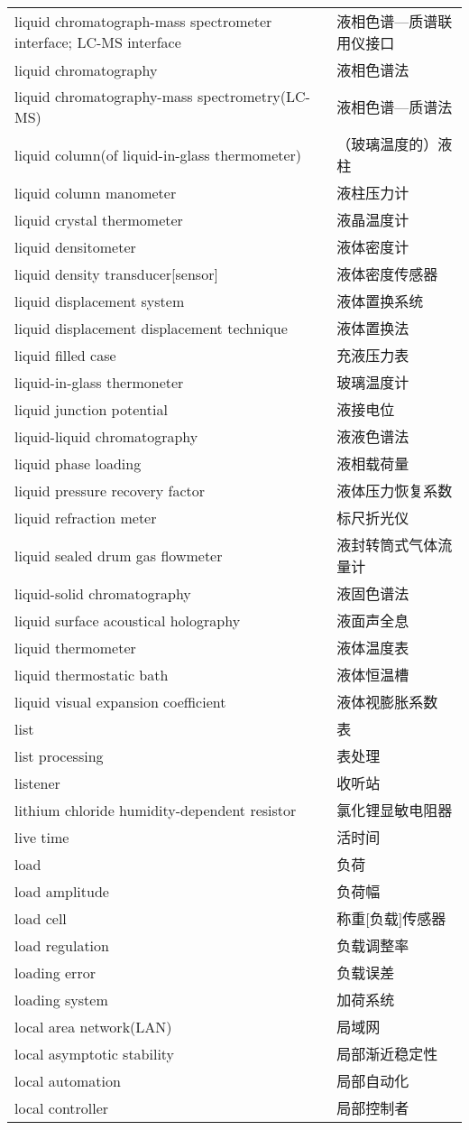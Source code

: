 \documentclass[
]{article}
\begin{document}
\begin{longtable}[]{@{}ll@{}}
liquid chromatograph-mass spectrometer interface; LC-MS interface &
液相色谱---质谱联用仪接口 \\
liquid chromatography & 液相色谱法 \\
liquid chromatography-mass spectrometry(LC-MS) & 液相色谱---质谱法 \\
liquid column(of liquid-in-glass thermometer) & （玻璃温度的）液柱 \\
liquid column manometer & 液柱压力计 \\
liquid crystal thermometer & 液晶温度计 \\
liquid densitometer & 液体密度计 \\
liquid density transducer{[}sensor{]} & 液体密度传感器 \\
liquid displacement system & 液体置换系统 \\
liquid displacement displacement technique & 液体置换法 \\
liquid filled case & 充液压力表 \\
liquid-in-glass thermoneter & 玻璃温度计 \\
liquid junction potential & 液接电位 \\
liquid-liquid chromatography & 液液色谱法 \\
liquid phase loading & 液相载荷量 \\
liquid pressure recovery factor & 液体压力恢复系数 \\
liquid refraction meter & 标尺折光仪 \\
liquid sealed drum gas flowmeter & 液封转筒式气体流量计 \\
liquid-solid chromatography & 液固色谱法 \\
liquid surface acoustical holography & 液面声全息 \\
liquid thermometer & 液体温度表 \\
liquid thermostatic bath & 液体恒温槽 \\
liquid visual expansion coefficient & 液体视膨胀系数 \\
list & 表 \\
list processing & 表处理 \\
listener & 收听站 \\
lithium chloride humidity-dependent resistor & 氯化锂显敏电阻器 \\
live time & 活时间 \\
load & 负荷 \\
load amplitude & 负荷幅 \\
load cell & 称重{[}负载{]}传感器 \\
load regulation & 负载调整率 \\
loading error & 负载误差 \\
loading system & 加荷系统 \\
local area network(LAN) & 局域网 \\
local asymptotic stability & 局部渐近稳定性 \\
local automation & 局部自动化 \\
local controller & 局部控制者 \\
\bottomrule()
\end{longtable}
\end{document}
